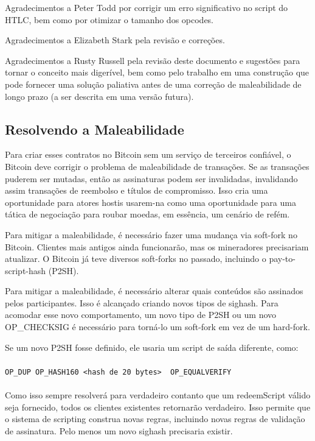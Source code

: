 \documentclass[letterpaper,11pt]{article}
\begin{document}
Agradecimentos a Peter Todd por corrigir um erro significativo no script
do HTLC, bem como por otimizar o tamanho dos opcodes.

Agradecimentos a Elizabeth Stark pela revisão e correções.

Agradecimentos a Rusty Russell pela revisão deste documento e sugestões
para tornar o conceito mais digerível, bem como pelo trabalho em uma
construção que pode fornecer uma solução paliativa antes de uma correção
de maleabilidade de longo prazo (a ser descrita em uma versão futura).

\begin{appendices}
\section{Resolvendo a Maleabilidade}

Para criar esses contratos no Bitcoin sem um serviço de terceiros
confiável, o Bitcoin deve corrigir o problema de maleabilidade de
transações. Se as transações puderem ser mutadas, então as assinaturas
podem ser invalidadas, invalidando assim transações de reembolso e títulos
de compromisso. Isso cria uma oportunidade para atores hostis usarem-na
como uma oportunidade para uma tática de negociação para roubar moedas,
em essência, um cenário de refém.

Para mitigar a maleabilidade, é necessário fazer uma mudança via soft-fork
no Bitcoin. Clientes mais antigos ainda funcionarão, mas os mineradores
precisariam atualizar. O Bitcoin já teve diversos soft-forks no passado,
incluindo o pay-to-script-hash (P2SH).

Para mitigar a maleabilidade, é necessário alterar quais conteúdos são
assinados pelos participantes. Isso é alcançado criando novos tipos de
sighash. Para acomodar esse novo comportamento, um novo tipo de P2SH ou
um novo OP\_CHECKSIG é necessário para torná-lo um soft-fork em vez de um
hard-fork.

Se um novo P2SH fosse definido, ele usaria um script de saída diferente,
como:
\\\\
\noindent\texttt{OP\_DUP OP\_HASH160 \textless hash de 20 bytes\textgreater
~OP\_EQUALVERIFY}
\\\\

Como isso sempre resolverá para verdadeiro contanto que um redeemScript
válido seja fornecido, todos os clientes existentes retornarão verdadeiro.
Isso permite que o sistema de scripting construa novas regras, incluindo
novas regras de validação de assinatura. Pelo menos um novo sighash
precisaria existir.


\end{appendices}
\end{document}
